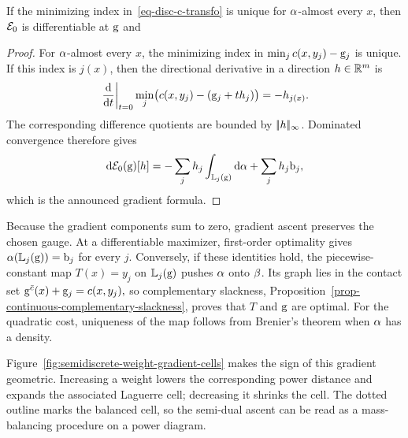 \begin{prop}\label{prop-semidiscrete-dual-gradient}
If the minimizing index in~\eqref{eq-disc-c-transfo} is unique for $\alpha$-almost every $x$, then $\mathcal{E}_0$ is differentiable at $\mathrm{g}$ and
\end{prop}
\begin{proof}
	For $\alpha$-almost every $x$, the minimizing index in $\min_j c(x,y_j)-\mathrm{g}_j$ is unique. If this index is $j(x)$, then the directional derivative in a direction $h\in\mathbb{R}^m$ is
	\[
		\left.\frac{\mathrm{d}}{\mathrm{d} t}\right|_{t=0}
		\min_j \bigl(c(x,y_j)-(\mathrm{g}_j+t h_j)\bigr)
		=
		-h_{j(x)}.
	\]
	The corresponding difference quotients are bounded by $|\!| h |\!|_\infty$. Dominated convergence therefore gives
	\[
		\mathrm{d}\mathcal{E}_0(\mathrm{g})[h]
		=
		-\sum_j h_j\int_{\mathbb{L}_j(\mathrm{g})}\mathrm{d}\alpha
		+\sum_j h_j\mathrm{b}_j,
	\]
	which is the announced gradient formula.
\end{proof}

Because the gradient components sum to zero, gradient ascent preserves the chosen gauge. At a differentiable maximizer, first-order optimality gives
\(
\alpha(\mathbb{L}_j(\mathrm{g}))=\mathrm{b}_j
\)
for every $j$. Conversely, if these identities hold, the piecewise-constant map $T(x)=y_j$ on $\mathbb{L}_j(\mathrm{g})$ pushes $\alpha$ onto $\beta$. Its graph lies in the contact set
\(
\mathrm{g}^{\bar c}(x)+\mathrm{g}_j=c(x,y_j),
\)
so complementary slackness, Proposition~\ref{prop-continuous-complementary-slackness}, proves that $T$ and $\mathrm{g}$ are optimal. For the quadratic cost, uniqueness of the map follows from Brenier's theorem when $\alpha$ has a density.


Figure~\ref{fig:semidiscrete-weight-gradient-cells} makes the sign of this gradient geometric. Increasing a weight lowers the corresponding power distance and expands the associated Laguerre cell; decreasing it shrinks the cell. The dotted outline marks the balanced cell, so the semi-dual ascent can be read as a mass-balancing procedure on a power diagram.

